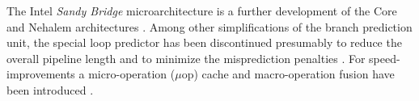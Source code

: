 
The Intel\TReg{} \emph{Sandy Bridge} microarchitecture is a further development
of the Core and Nehalem architectures \cite{fog11}. Among other simplifications
of the branch prediction unit, the special loop predictor has been discontinued
presumably to reduce the overall pipeline length and to minimize the
misprediction penalties \cite{fog11}. For speed-improvements a micro-operation
($\mu$op) cache and macro-operation fusion have been introduced \cite{fog11}.

